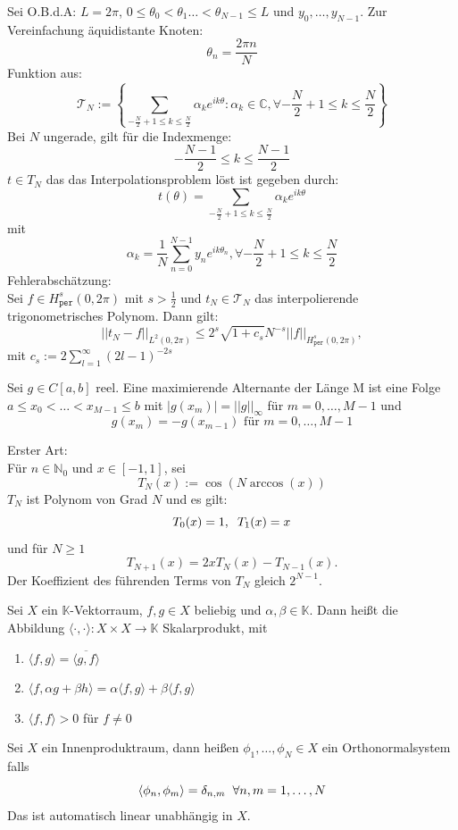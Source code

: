 \documentclass{report}
\begin{document}
 {
  Sei O.B.d.A: $L= 2\pi$, $0 \leq \theta_0 < \theta_1 \dots 
    < \theta_{N-1} \leq L
  $
  und $y_0, \dots, y_{N-1}$.
  Zur Vereinfachung äquidistante Knoten:
  \[
    \theta_n = \frac{2\pi n}{N}
  \]
  Funktion aus: 
  \[
    \mathcal{T}_N := 
    \left\{\sum_{-\frac{N}{2} +1 \leq k \leq \frac{N}{2}}
      \alpha_ke^{ik\theta} : \alpha_k \in \mathbb{C},
      \forall -\frac{N}{2}+1\leq k \leq \frac{N}{2}
    \right\}
  \]
  Bei $N$ ungerade, gilt für die Indexmenge:
  \[
    -\frac{N-1}{2} \leq k \leq \frac{N-1}{2}
  \]
  $t \in T_N$ das das Interpolationsproblem löst 
  ist gegeben durch:
  \[
    t(\theta) = \sum_{-\frac{N}{2} +1 \leq k \leq \frac{N}{2}}
      \alpha_ke^{ik\theta}
  \]
  mit
  \[
    \alpha_k = \frac{1}{N}\sum_{n=0}^{N-1}y_ne^{ik\theta_n}, 
    \forall-\frac{N}{2} +1 \leq k \leq \frac{N}{2}
  \]
  Fehlerabschätzung:\\
  Sei $f \in H^s_\texttt{per}(0,2\pi)$ mit $s > \frac{1}{2}$
  und $t_N \in \mathcal{T}_N$ das interpolierende trigonometrisches
  Polynom. Dann gilt: 
  \[
    ||t_N-f||_{L^2(0,2\pi)} \leq 2^s 
    \sqrt{1 + c_s } N^{-s}||f||_{H^s_\texttt{per}(0,2\pi)},
  \]
  mit $c_s := 2 \sum^{\infty}_{l=1} (2l-1)^{-2s}$
}

 {
  Sei $g \in C[a,b]$ reel. Eine maximierende 
  Alternante der Länge M ist eine Folge 
  $a \leq x_0 < \dots < x_{M-1} \leq b$ 
  mit $|g(x_m)| = ||g||_\infty$ für $m = 0,\dots,M-1$
  und 
  \[
    g(x_m) = -g(x_{m-1}) \text{ für } m= 0,\dots,M-1
  \]
}

 {
  Erster Art:\\
  Für $n \in \mathbb{N}_0$ und 
  $x \in [-1,1]$, sei
  \[
    T_N(x) := \cos(N \arccos(x))
  \]
  $T_N$ ist Polynom von Grad $N$ und es gilt:
  \[
    T_0(x) = 1, \hspace{0.2cm} T_1(x) = x
  \]
  und für $N \geq 1$
  \[
    T_{N+1}(x) = 2xT_N(x) - T_{N-1}(x).
  \]
  Der Koeffizient des führenden Terms von $T_N$ 
  gleich $2^{N-1}$.
}
 {
  Sei $X$ ein $\mathbb{K}$-Vektorraum,
  $f,g \in X$ beliebig und $\alpha, \beta \in \mathbb{K}$.
  Dann heißt die Abbildung $\langle \cdot,\cdot \rangle:
  X\times X \to \mathbb{K}$ Skalarprodukt, mit

  \begin{enumerate}
    \item $\langle f, g\rangle = \overline{\langle g, f\rangle}$
    \item $\langle f, \alpha g + \beta h\rangle =
      \alpha \langle f, g\rangle + \beta \langle f, g\rangle$
    \item $\langle f, f \rangle  > 0$ für $f \neq 0$
  \end{enumerate}
}
 {
  Sei $X$ ein Innenproduktraum, dann heißen 
  $\phi_1, \dots, \phi_N \in X$ ein Orthonormalsystem
  falls
  \[
    \langle \phi_n, \phi_m \rangle = \delta_{n,m}
    \hspace{0.2cm} \forall n,m = 1,\dots, N
  \]
  Das ist automatisch linear unabhängig in $X$.
}
\end{document}
